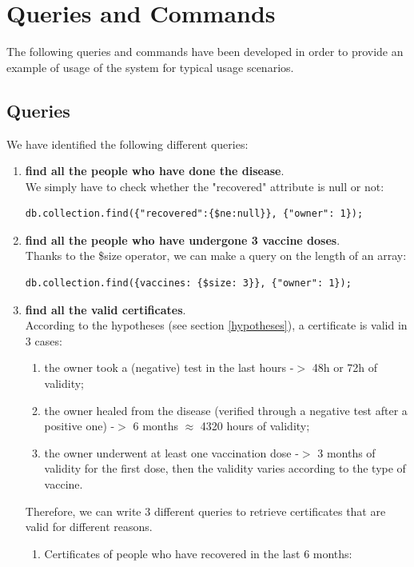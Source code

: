 \documentclass{article}
\begin{document}
\section{Queries and Commands}
The following queries and commands have been developed in order to provide an example of usage of the system for typical usage scenarios.
\subsection{Queries}
We have identified the following different queries:
\begin{enumerate}
\item \textbf{find all the people who have done the disease}.\\
We simply have to check whether the "recovered" attribute is null or not:
\begin{lstlisting}
db.collection.find({"recovered":{$ne:null}}, {"owner": 1});
    \end{lstlisting}
    \item \textbf{find all the people who have undergone 3 vaccine doses}.\\
    Thanks to the \$size operator, we can make a query on the length of an array:
    \begin{lstlisting}
db.collection.find({vaccines: {$size: 3}}, {"owner": 1});
    \end{lstlisting}
    \item \textbf{find all the valid certificates}.\\
    According to the hypotheses (see section \ref{hypotheses}), a certificate is valid in 3 cases:
    \begin{enumerate}
        \item the owner took a (negative) test in the last hours -$>$ 48h or 72h of validity;
        \item the owner healed from the disease (verified through a negative test after a positive one) -$>$ 6 months $\approx$ 4320 hours of validity;
        \item the owner underwent at least one vaccination dose -$>$ 3 months of validity for the first dose, then the validity varies according to the type of vaccine.
    \end{enumerate}
    Therefore, we can write 3 different queries to retrieve certificates that are valid for different reasons.\\
    \begin{enumerate}
        \item Certificates of people who have recovered in the last 6 months:

\end{enumerate}
\end{enumerate}
\end{document}

